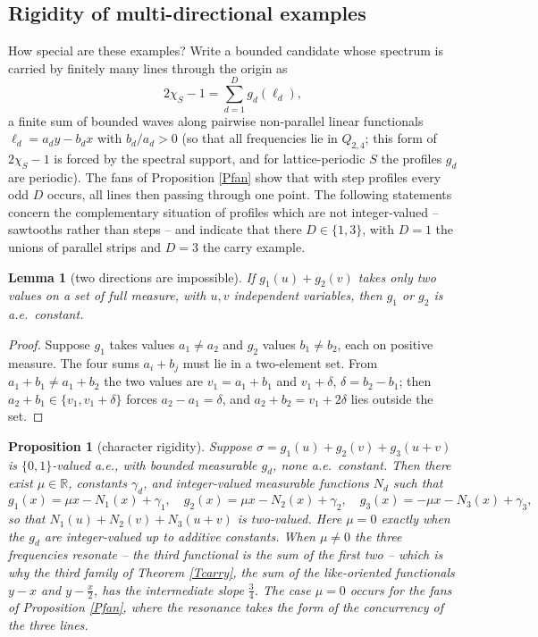 \documentclass{article}
\newtheorem{lemma}{Lemma}
\newtheorem{proposition}{Proposition}
\def\R{{\mathbb R}}
\begin{document}
	\subsection{Rigidity of multi-directional examples}

	How special are these examples? Write a bounded candidate whose spectrum is carried by finitely many lines through the origin as
	$$2\chi_S-1=\sum_{d=1}^Dg_d(\ell_d),$$
	a finite sum of bounded waves along pairwise non-parallel linear functionals $\ell_d=a_dy-b_dx$ with $b_d/a_d>0$ (so that all frequencies lie in $Q_{2,4}$; this form of $2\chi_S-1$ is forced by the spectral support, and for lattice-periodic $S$ the profiles $g_d$ are periodic). The fans of Proposition \ref{Pfan} show that with step profiles every odd $D$ occurs, all lines then passing through one point. The following statements concern the complementary situation of profiles which are not integer-valued -- sawtooths rather than steps -- and indicate that there $D\in\{1,3\}$, with $D=1$ the unions of parallel strips and $D=3$ the carry example.

	\begin{lemma}[two directions are impossible]\label{Ltwo}
		If $g_1(u)+g_2(v)$ takes only two values on a set of full measure, with $u,v$ independent variables, then $g_1$ or $g_2$ is a.e.\ constant.
	\end{lemma}

	\begin{proof}
		Suppose $g_1$ takes values $a_1\neq a_2$ and $g_2$ values $b_1\neq b_2$, each on positive measure. The four sums $a_i+b_j$ must lie in a two-element set. From $a_1+b_1\neq a_1+b_2$ the two values are $v_1=a_1+b_1$ and $v_1+\delta$, $\delta=b_2-b_1$; then $a_2+b_1\in\{v_1,v_1+\delta\}$ forces $a_2-a_1=\delta$, and $a_2+b_2=v_1+2\delta$ lies outside the set.
	\end{proof}

	\begin{proposition}[character rigidity]\label{Pchar}
		Suppose $\sigma=g_1(u)+g_2(v)+g_3(u+v)$ is $\{0,1\}$-valued a.e., with bounded measurable $g_d$, none a.e.\ constant. Then there exist $\mu\in\R$, constants $\gamma_d$, and integer-valued measurable functions $N_d$ such that
		$$g_1(x)=\mu x-N_1(x)+\gamma_1,\quad g_2(x)=\mu x-N_2(x)+\gamma_2,\quad g_3(x)=-\mu x-N_3(x)+\gamma_3 ,$$
		so that $N_1(u)+N_2(v)+N_3(u+v)$ is two-valued. Here $\mu=0$ exactly when the $g_d$ are integer-valued up to additive constants. When $\mu\neq0$ the three frequencies resonate -- the third functional is the sum of the first two -- which is why the third family of Theorem \ref{Tcarry}, the sum of the like-oriented functionals $y-x$ and $y-\frac x2$, has the intermediate slope $\frac 34$. The case $\mu=0$ occurs for the fans of Proposition \ref{Pfan}, where the resonance takes the form of the concurrency of the three lines.
	\end{proposition}
\end{document}
